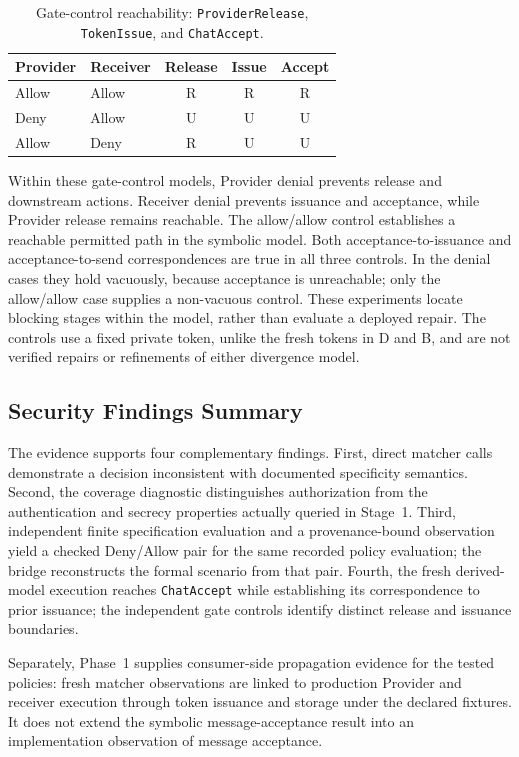 \begin{table}[htbp]
\centering
\small
\begin{tabular}{llccc}
\hline
Provider & Receiver & Release & Issue & Accept \\
\hline
Allow & Allow & R & R & R \\
Deny & Allow & U & U & U \\
Allow & Deny & R & U & U \\
\hline
\end{tabular}
\caption{Gate-control reachability: \texttt{ProviderRelease},
\texttt{TokenIssue}, and \texttt{ChatAccept}.}
\label{tab:gate-evaluation}
\end{table}

Within these gate-control models, Provider denial prevents release and
downstream actions. Receiver denial prevents issuance and acceptance, while
Provider release remains reachable.
The allow/allow control establishes a reachable permitted path in the symbolic model.
Both acceptance-to-issuance and acceptance-to-send correspondences are
true in all three controls. In the denial cases they hold vacuously,
because acceptance is unreachable; only the allow/allow case supplies
a non-vacuous control. These experiments locate blocking stages within
the model, rather than evaluate a deployed repair. The controls use a
fixed private token, unlike the fresh tokens in D and B, and are not verified
repairs or refinements of either divergence model.

\subsection{Security Findings Summary}

The evidence supports four complementary findings. First, direct matcher
calls demonstrate a decision inconsistent with documented specificity
semantics. Second, the coverage diagnostic distinguishes authorization
from the authentication and secrecy properties actually queried in
Stage~1. Third, independent finite specification evaluation and a
provenance-bound observation yield a checked Deny/Allow pair for the same
recorded policy evaluation; the bridge reconstructs the formal scenario
from that pair. Fourth, the fresh derived-model execution reaches
\texttt{ChatAccept} while establishing its correspondence to prior issuance;
the independent gate controls identify distinct release and issuance boundaries.

Separately, Phase~1 supplies consumer-side propagation evidence for the
tested policies: fresh matcher observations are linked to production
Provider and receiver execution through token issuance and storage under
the declared fixtures. It does not extend the symbolic message-acceptance
result into an implementation observation of message acceptance.


